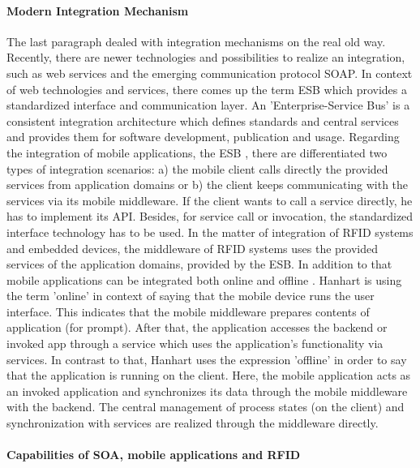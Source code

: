 \paragraph{Modern Integration Mechanism}

The last paragraph dealed with integration mechanisms on the real old way. Recently, there are newer technologies and possibilities to realize an integration, such as web services and the emerging communication protocol \ac{SOAP}. In context of web technologies and services, there comes up the term \ac{ESB}\cite[p.141 ff.]{mobile} which provides a standardized interface and communication layer. An 'Enterprise-Service Bus' is a consistent integration architecture which defines standards and central services and provides them for software development, publication and usage.  Regarding the integration of mobile applications, the ESB \cite[p.143]{mobile}, there are differentiated two types of integration scenarios: a) the mobile client calls directly the provided services from application domains or b) the client keeps communicating with the services via its mobile middleware. If the client wants to call a service directly, he has to implement its \ac{API}. Besides, for service call or invocation, the standardized interface technology has to be used.
In the matter of integration of RFID systems and embedded devices, the middleware of RFID systems uses the provided services of the application domains, provided by the ESB. In addition to that mobile applications can be integrated both online and offline \cite[p.146 ff.]{mobile}. Hanhart is using the term 'online' in context of saying that the mobile device runs the user interface. This indicates that the mobile middleware prepares contents of application (for prompt). After that, the application accesses the backend or invoked app through a service which uses the application's functionality via services. In contrast to that, Hanhart uses the expression 'offline' in order to say that the application is running on the client. Here, the mobile application acts as an invoked application and synchronizes its data through the mobile middleware with the backend. The central management of process states (on the client) and synchronization with services are realized through the middleware directly.

\paragraph{Capabilities of SOA, mobile applications and RFID}


